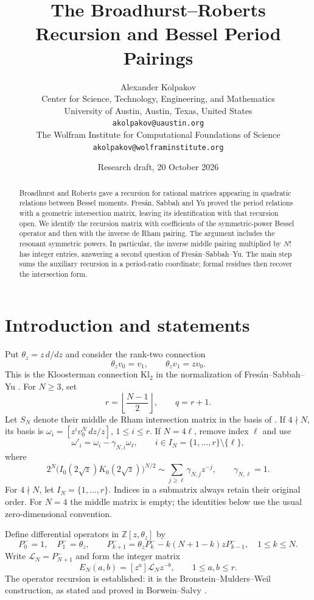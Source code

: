\documentclass[11pt]{article}
\title{The Broadhurst--Roberts Recursion and Bessel Period Pairings}
\author{Alexander Kolpakov\\[0.5ex]
\small Center for Science, Technology, Engineering, and Mathematics\\
\small University of Austin, Austin, Texas, United States\\
\small \texttt{akolpakov@uaustin.org}\\[0.75ex]
\small The Wolfram Institute for Computational Foundations of Science\\
\small \texttt{akolpakov@wolframinstitute.org}}
\date{Research draft, 20 October 2026}
\theoremstyle{definition}
\newcommand{\Z}{\mathbb Z}
\numberwithin{equation}{section}
\begin{document}
\maketitle
\begin{abstract}
Broadhurst and Roberts gave a recursion for rational matrices appearing
in quadratic relations between Bessel moments. Fres\'an, Sabbah and Yu
proved the period relations with a geometric intersection matrix,
leaving its identification with that recursion open.
We identify the recursion matrix with coefficients of the
symmetric-power Bessel operator and then with the inverse de Rham
pairing. The argument includes the resonant symmetric powers.
In particular, the inverse middle pairing multiplied by $N!$ has
integer entries, answering a second question of Fres\'an--Sabbah--Yu.
The main step sums the auxiliary recursion in a period-ratio coordinate;
formal residues then recover the intersection form.
\end{abstract}

\section{Introduction and statements}
Put $\theta_z=z\,d/dz$ and consider the rank-two connection
\begin{equation}\label{eq:connection}
 \theta_z v_0=v_1,\qquad \theta_z v_1=zv_0.
\end{equation}
This is the Kloosterman connection $\mathrm{Kl}_2$ in the normalization
of Fres\'an--Sabbah--Yu \cite{FSY}. For $N\ge3$, set
\[
 r=\left\lfloor\frac{N-1}{2}\right\rfloor,\qquad q=r+1.
\]
Let $S_N$ denote their middle de Rham intersection matrix in the basis
of \cite[Corollary 3.11]{FSY}. If $4\nmid N$, its basis is
$\omega_i=[z^iv_0^N\,dz/z]$, $1\le i\le r$.
If $N=4\ell$, remove index $\ell$ and use
\begin{equation}\label{eq:middlebasis}
 \omega'_i=\omega_i-\gamma_{N,i}\omega_\ell,\qquad
 i\in I_N=\{1,\ldots,r\}\setminus\{\ell\},
\end{equation}
where
\begin{equation}\label{eq:gamma}
 2^N\bigl(I_0(2\sqrt z)K_0(2\sqrt z)\bigr)^{N/2}
 \sim\sum_{j\ge\ell}\gamma_{N,j}z^{-j},\qquad
 \gamma_{N,\ell}=1.
\end{equation}
For $4\nmid N$, let $I_N=\{1,\ldots,r\}$.
Indices in a submatrix always retain their original order.
For $N=4$ the middle matrix is empty; the identities below use the
usual zero-dimensional convention.

Define differential operators in $\Z[z,\theta_z]$ by
\begin{equation}\label{eq:operatorrecursion}
 P^-_0=1,\quad P^-_1=\theta_z,\qquad
 P^-_{k+1}=\theta_zP^-_k-k(N+1-k)zP^-_{k-1},\quad 1\le k\le N.
\end{equation}
Write $\mathcal L_N=P^-_{N+1}$ and form the integer matrix
\begin{equation}\label{eq:E}
 E_N(a,b)=[z^a]\mathcal L_Nz^{-b},\qquad 1\le a,b\le r.
\end{equation}
The operator recursion is established: it is the
Bronstein--Mulders--Weil construction, as stated and proved in
Borwein--Salvy \cite[Lemmas 2--3]{BS}.
\end{document}
